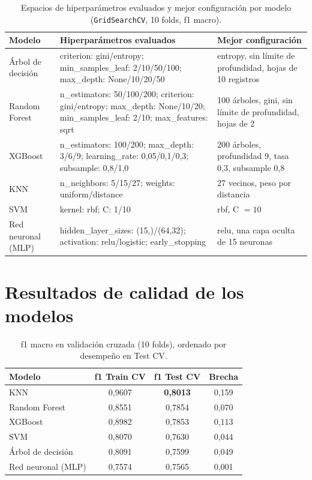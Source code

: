 \documentclass[11pt]{article}
\newcommand{\vartxt}[1]{\texttt{#1}}
\begin{document}
\begin{table}[H]
\centering\small
\caption{Espacios de hiperparámetros evaluados y mejor configuración por modelo (\vartxt{GridSearchCV}, 10 folds, f1 macro).}
\label{tab:grid}
\begin{tabular}{p{2.6cm} p{7.2cm} p{4.6cm}}
\toprule
\textbf{Modelo} & \textbf{Hiperparámetros evaluados} & \textbf{Mejor configuración} \\
\midrule
Árbol de decisión & criterion: gini/entropy; min\_samples\_leaf: 2/10/50/100; max\_depth: None/10/20/50 & entropy, sin límite de profundidad, hojas de 10 registros \\
Random Forest & n\_estimators: 50/100/200; criterion: gini/entropy; max\_depth: None/10/20; min\_samples\_leaf: 2/10; max\_features: sqrt & 100 árboles, gini, sin límite de profundidad, hojas de 2 \\
XGBoost & n\_estimators: 100/200; max\_depth: 3/6/9; learning\_rate: 0{,}05/0{,}1/0{,}3; subsample: 0{,}8/1{,}0 & 200 árboles, profundidad 9, tasa 0{,}3, subsample 0{,}8 \\
KNN & n\_neighbors: 5/15/27; weights: uniform/distance & 27 vecinos, peso por distancia \\
SVM & kernel: rbf; C: 1/10 & rbf, C $=10$ \\
Red neuronal (MLP) & hidden\_layer\_sizes: (15,)/(64,32); activation: relu/logistic; early\_stopping & relu, una capa oculta de 15 neuronas \\
\bottomrule
\end{tabular}
\end{table}

\section{Resultados de calidad de los modelos}
\label{sec:resultados}

\begin{table}[H]
\centering\small
\caption{f1 macro en validación cruzada (10 folds), ordenado por desempeño en Test CV.}
\label{tab:resultados}
\begin{tabular}{lccc}
\toprule
\textbf{Modelo} & \textbf{f1 Train CV} & \textbf{f1 Test CV} & \textbf{Brecha} \\
\midrule
KNN & 0,9607 & \textbf{0,8013} & 0,159 \\
Random Forest & 0,8551 & 0,7854 & 0,070 \\
XGBoost & 0,8982 & 0,7853 & 0,113 \\
SVM & 0,8070 & 0,7630 & 0,044 \\
Árbol de decisión & 0,8091 & 0,7599 & 0,049 \\
Red neuronal (MLP) & 0,7574 & 0,7565 & 0,001 \\
\bottomrule
\end{tabular}
\end{table}
\end{document}
